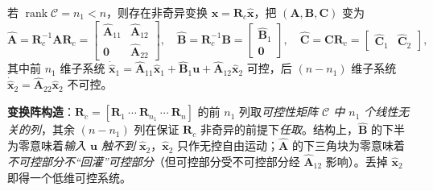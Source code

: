 \begin{theorem}[可控性分解]\label{thm:co-decomp-c}
若 $\operatorname{rank}\mathcal{C}=n_1<n$，则存在非奇异变换 $\mathbf{x}=\mathbf{R}_c\hat{\mathbf{x}}$，把 $(\mathbf{A},\mathbf{B},\mathbf{C})$ 变为
\begin{equation}
  \hat{\mathbf{A}}=\mathbf{R}_c^{-1}\mathbf{A}\mathbf{R}_c=\begin{bmatrix}\hat{\mathbf{A}}_{11}&\hat{\mathbf{A}}_{12}\\ \mathbf{0}&\hat{\mathbf{A}}_{22}\end{bmatrix},\quad
  \hat{\mathbf{B}}=\mathbf{R}_c^{-1}\mathbf{B}=\begin{bmatrix}\hat{\mathbf{B}}_1\\ \mathbf{0}\end{bmatrix},\quad
  \hat{\mathbf{C}}=\mathbf{C}\mathbf{R}_c=\begin{bmatrix}\hat{\mathbf{C}}_1&\hat{\mathbf{C}}_2\end{bmatrix},
  \label{eq:co-decomp-c}
\end{equation}
其中前 $n_1$ 维子系统 $\dot{\hat{\mathbf{x}}}_1=\hat{\mathbf{A}}_{11}\hat{\mathbf{x}}_1+\hat{\mathbf{B}}_1\mathbf{u}+\hat{\mathbf{A}}_{12}\hat{\mathbf{x}}_2$ 可控，后 $(n-n_1)$ 维子系统 $\dot{\hat{\mathbf{x}}}_2=\hat{\mathbf{A}}_{22}\hat{\mathbf{x}}_2$ 不可控\cite{liubao2006modern}。
\end{theorem}

\noindent\textbf{变换阵构造}：$\mathbf{R}_c=[\mathbf{R}_1\ \cdots\ \mathbf{R}_{n_1}\ \cdots\ \mathbf{R}_n]$ 的前 $n_1$ 列取\emph{可控性矩阵 $\mathcal{C}$ 中 $n_1$ 个线性无关的列}，其余 $(n-n_1)$ 列在保证 $\mathbf{R}_c$ 非奇异的前提下\emph{任取}\cite{liubao2006modern}。结构上，$\hat{\mathbf{B}}$ 的下半为零意味着\emph{输入 $\mathbf{u}$ 触不到 $\hat{\mathbf{x}}_2$}，$\hat{\mathbf{x}}_2$ 只作无控自由运动；$\hat{\mathbf{A}}$ 的下三角块为零意味着\emph{不可控部分不“回灌”可控部分}（但可控部分受不可控部分经 $\hat{\mathbf{A}}_{12}$ 影响）。丢掉 $\hat{\mathbf{x}}_2$ 即得一个低维可控系统。

